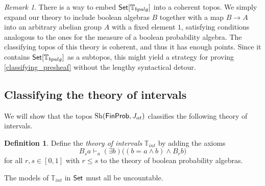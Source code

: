 \documentclass[a4paper]{amsproc}
\theoremstyle{plain}
\theoremstyle{definition}
\newtheorem{definition}[theorem]{Definition}
\theoremstyle{remark}
\newtheorem{remark}[theorem]{Remark}
\numberwithin{equation}{section}
\DeclareMathOperator{\Sh}{Sh}
\newcommand{\Set}{\textup{\textsf{Set}}}
\newcommand{\FinProb}{\textup{\textsf{FinProb}}}
\begin{document}
\begin{remark}
    There is a way to embed $\Set[\mathbb{T}_{bpalg}]$ into a coherent topos. We simply expand our theory to include boolean algebras $B$ together with a map $B \to A$ into an arbitrary abelian group $A$ with a fixed element $1$, satisfying conditions analogous to the ones for the measure of a boolean probability algebra. The classifying topos of this theory is coherent, and thus it has enough points. Since it contains $\Set[\mathbb{T}_{bpalg}]$ as a subtopos, this might yield a strategy for proving \ref{classifying_presheaf} without the lengthy syntactical detour.
\end{remark}

\subsection{Classifying the theory of intervals} \label{theory_of_intervals}

We will show that the topos $\Sh(\FinProb, J_{at})$ classifies the following theory of intervals.


\begin{definition}
    Define the \textit{theory of intervals} $\mathbb{T}_{int}$ by adding the axioms
    \[
    B_s a \vdash_a (\exists b) \big ( (b = a \wedge b) \wedge B_r b \big )
    \]
    for all $r,s \in [0,1]$ with $r \leq s$ to the theory of boolean probability algebras.
\end{definition}

The models of $\mathbb{T}_{int}$ in $\Set$ must all be uncountable.
\end{document}
